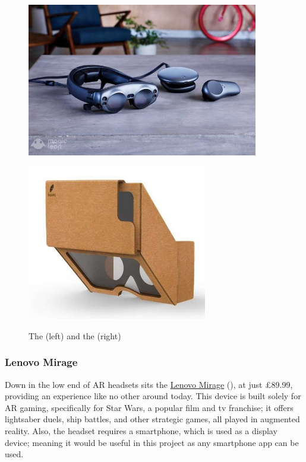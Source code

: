 \begin{figure}[ht]
\begin{minipage}{\textwidth}
\begin{minipage}{0.5\textwidth}
    \centering
    \includegraphics[width=0.9\textwidth]{images/litreview/magicleap}
    \label{fig:magicleap}
\end{minipage}\hfill
\begin{minipage}{0.5\textwidth}
    \centering
    \includegraphics[width=0.7\textwidth]{images/litreview/holokit}
    \label{fig:holokit}
\end{minipage}
\caption{The \protect{} (left) and the \protect{} (right)}
\end{minipage}
\end{figure}


\subsubsection{Lenovo Mirage}
Down in the low end of AR headsets sits the \href{https://www.lenovo.com/gb/en/jedichallenges/}{Lenovo Mirage} (\citeyear{jedi}), at just \pounds89.99, providing an experience like no other around today. This device is built solely for AR gaming, specifically for Star Wars, a popular film and tv franchise; it offers lightsaber duels, ship battles, and other strategic games, all played in augmented reality. Also, the headset requires a smartphone, which is used as a display device; meaning it would be useful in this project as any smartphone app can be used.

